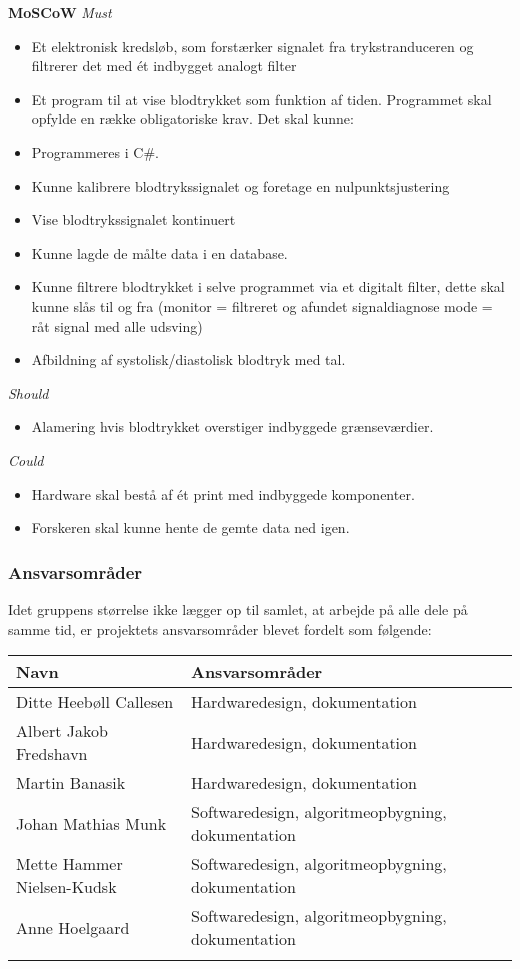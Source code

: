 \textbf{MoSCoW}
\textit{Must}
\begin{itemize}
\item Et elektronisk kredsløb, som forstærker signalet fra trykstranduceren og filtrerer det med ét indbygget analogt filter
\item Et program til at vise blodtrykket som funktion af tiden. Programmet skal opfylde en række obligatoriske krav. Det skal kunne:
\end{itemize}
\begin{itemize}
\item Programmeres i C#.
\item Kunne kalibrere blodtrykssignalet og foretage en nulpunktsjustering
\item Vise blodtrykssignalet kontinuert
\item Kunne lagde de målte data i en database.
\item Kunne filtrere blodtrykket i selve programmet via et digitalt filter, dette skal kunne slås til og fra (monitor = filtreret og afundet signaldiagnose mode = råt signal med alle udsving)
\item Afbildning af systolisk/diastolisk blodtryk med tal.
\end{itemize}
\textit{Should}
\begin{itemize}
\item Alamering hvis blodtrykket overstiger indbyggede grænseværdier.
\end{itemize}
\textit{Could}
\begin{itemize}
\item Hardware skal bestå af ét print med indbyggede komponenter.
\item Forskeren skal kunne hente de gemte data ned igen.
\end{itemize}
\subsubsection{Ansvarsområder}

Idet gruppens størrelse ikke lægger op til samlet, at arbejde på alle dele på samme tid, er projektets ansvarsområder blevet fordelt som følgende:

\begin{longtabu} to 
    Navn &    Ansvarsområder &    \\[-1ex]
    \midrule
    Ditte Heebøll Callesen &   Hardwaredesign, dokumentation	&    \\
    Albert Jakob Fredshavn &   Hardwaredesign, dokumentation	&    \\
    Martin Banasik         &   Hardwaredesign, dokumentation	&    \\
    Johan Mathias Munk     &   Softwaredesign, algoritmeopbygning, dokumentation &    \\
    Mette Hammer Nielsen-Kudsk  &   Softwaredesign, algoritmeopbygning, dokumentation	&    \\
   	Anne Hoelgaard    &   Softwaredesign, algoritmeopbygning, dokumentation	&    \\
\label{version_Systemark}
\end{longtabu}